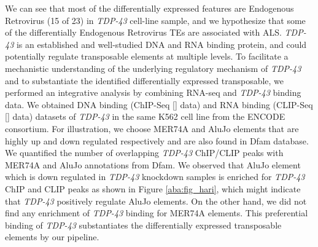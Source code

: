 \documentclass[wsdraft]{ws-procs11x85}
\begin{document}
We can see that most of the differentially expressed features are Endogenous Retrovirus (15 of 23) in \textit{TDP-43} cell-line sample, and we hypothesize that some of the differentially Endogenous Retrovirus TEs are associated with ALS.
\textit{TDP-43} is an established and well-studied DNA and RNA binding protein,
and could potentially regulate transposable elements at multiple levels.\cite{tan2016extensive} 
To facilitate a mechanistic understanding of the underlying regulatory mechanism of \textit{TDP-43} and to substantiate the identified differentially expressed transposable, we performed an integrative analysis by combining RNA-seq and \textit{TDP-43} binding data. 
We obtained DNA binding (ChIP-Seq [] data) and RNA binding (CLIP-Seq [] data)
datasets of \textit{TDP-43} in the same K562 cell line from the ENCODE consortium.
For illustration, we choose MER74A and AluJo elements that are highly up and down regulated respectively and are also found in 
Dfam database.\cite{hubley2015dfam} We quantified the number of overlapping \textit{TDP-43} ChIP/CLIP peaks with MER74A and AluJo annotations 
from Dfam. We observed that AluJo element which is down regulated in \textit{TDP-43} knockdown samples is enriched for \textit{TDP-43} 
ChIP and CLIP peaks as shown in Figure \ref{aba:fig_hari}, which might indicate that \textit{TDP-43} positively regulate AluJo elements. 
On the other hand, we did not find any enrichment of \textit{TDP-43} binding for MER74A elements. This preferential binding of \textit{TDP-43} substantiates the differentially expressed transposable elements by our pipeline. 
\end{document}

